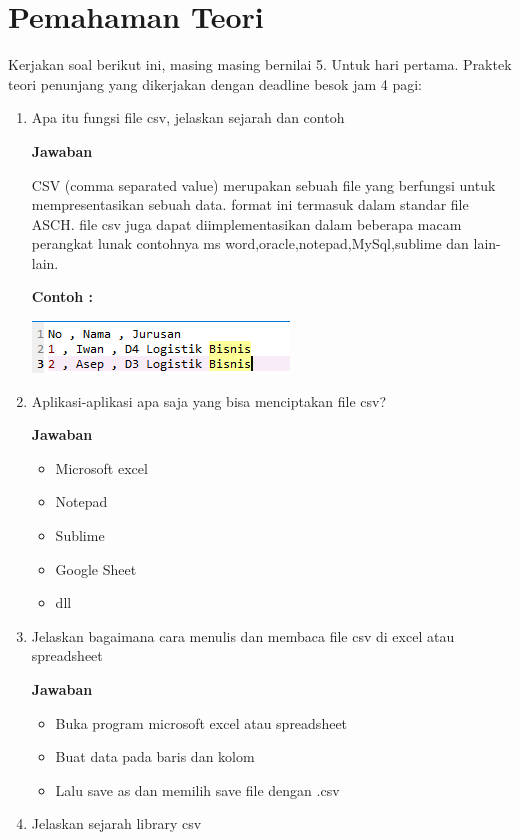 \section{Pemahaman Teori}
Kerjakan soal berikut ini, masing masing bernilai 5. Untuk hari pertama.
Praktek teori penunjang yang dikerjakan dengan deadline besok jam 4 pagi:
\begin{enumerate}
\item
Apa itu fungsi file csv, jelaskan sejarah dan contoh
\par\textbf{Jawaban}
\par CSV (comma separated value) merupakan sebuah file yang berfungsi untuk mempresentasikan sebuah data. format ini termasuk dalam standar file ASCH. file csv juga dapat diimplementasikan dalam beberapa macam perangkat lunak contohnya ms word,oracle,notepad,MySql,sublime dan lain-lain.
\par \textbf{Contoh :}
\par
      \begin{centering}
          \centering
          \includegraphics[scale=1]{figures/chapter 4/1.PNG}
      \end{centering}
\item
Aplikasi-aplikasi apa saja yang bisa menciptakan file csv?
\par \textbf{Jawaban}
\begin{itemize}
    \item Microsoft excel
    \item Notepad
    \item Sublime
    \item Google Sheet
    \item dll
\end{itemize}
\item
Jelaskan bagaimana cara menulis dan membaca file csv di excel atau spreadsheet
\par\textbf{Jawaban}
\begin{itemize}
    \item Buka program microsoft excel atau spreadsheet
    \item Buat data pada baris dan kolom
    \item Lalu save as dan memilih save file dengan .csv
\end{itemize}
\item
Jelaskan sejarah library csv

\end{enumerate}
